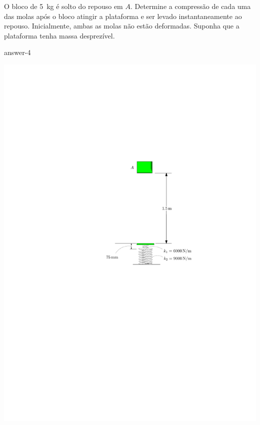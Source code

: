 
\item O bloco de \SI{5}{\kilogram} é solto do repouso em $A$. Determine a compressão de cada uma das molas após o bloco atingir a plataforma e ser levado instantaneamente ao repouso. Inicialmente, ambas as molas não estão deformadas. Suponha que a plataforma tenha massa desprezível.

{answer-4}

\vspace{-1.6cm}
\begin{flushright}
    \includegraphics[scale=1.2]{images/draw_4.pdf}
\end{flushright}